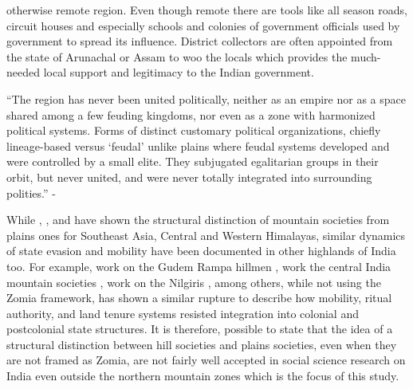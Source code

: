 \begin{sloppypar}
otherwise remote region. Even though remote there are tools like all season roads, circuit houses and especially schools and colonies of government officials used by government to spread its influence. District collectors are often appointed from the state of Arunachal or Assam to woo the locals which provides the much-needed local support and legitimacy to the Indian government.  

\vspace{0.3cm}

 \enquote{The region has never been united politically, neither as an empire nor as a space shared among a few feuding kingdoms, nor even as a zone with harmonized political systems. Forms of distinct customary political organizations, chiefly lineage-based versus \enquote{feudal} unlike plains where feudal systems developed and were controlled by a small elite. They subjugated egalitarian groups in their orbit, but never united, and were never totally integrated into surrounding polities.} - \citep{michaud2017s}

\vspace{0.3cm}
While \cite{jamesscott}, \cite{shneiderman2010central}  , and \cite{alam2008becoming} have shown the structural distinction of mountain societies from plains ones for Southeast Asia, Central and Western Himalayas, similar dynamics of state evasion and mobility have been documented in other highlands of India too. For example, \cite{arnold1982rebellious} work on the Gudem Rampa hillmen , \cite{sundar2001debating,sundar2005custom} work the central India mountain societies , \cite{cederlof2002narratives} work on the Nilgiris , among others, while not using the Zomia framework, has shown a similar rupture to describe how mobility, ritual authority, and land tenure systems resisted integration into colonial and postcolonial state structures. It is therefore, possible to state that the idea of a structural distinction between hill societies and plains societies, even when they are not framed as Zomia, are not fairly well accepted in social science research on India even outside the northern mountain zones which is the focus of this study.


\end{sloppypar}
